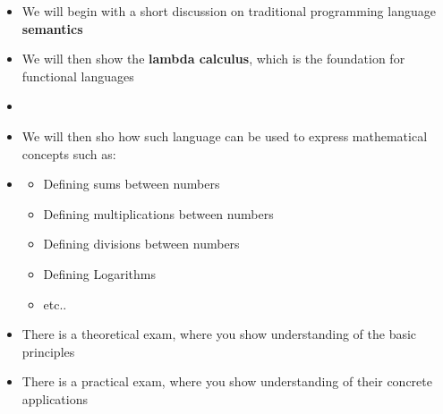 \documentclass{beamer}
\begin{document}
\begin{frame}[fragile]{\CurrentSection}
\begin{block}{\CurrentSubSection}
\begin{itemize}
\item We will begin with a short discussion on traditional programming language \textbf{semantics}
\item We will then show the \textbf{lambda calculus}, which is the foundation for functional languages
\item \item We will then sho how such language can be used to express mathematical concepts such as:
 
\item \begin{exampleblock}{}
\begin{itemize}
\item Defining sums between numbers
\item Defining multiplications between numbers
\item Defining divisions between numbers
\item Defining Logarithms
\item etc..

\end{itemize}

\end{exampleblock}


 


\end{itemize}

\end{block}


\end{frame}

\begin{frame}[fragile]{\CurrentSection}
\begin{block}{\CurrentSubSection}
\begin{itemize}
\item There is a theoretical exam, where you show understanding of the basic principles
\item There is a practical exam, where you show understanding of their concrete applications

\end{itemize}

\end{block}


\end{frame}
\end{document}
